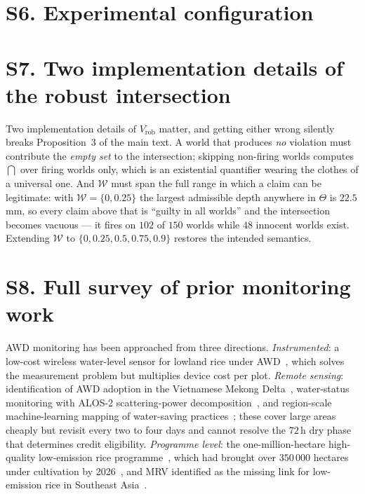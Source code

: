 \section*{S6. Experimental configuration}

\begin{table}[!h]
\centering
\caption{Experimental configuration. Every value is
reproducible from the released code and the public ERA5 forcing.}
\label{tab:setup}
\footnotesize

\end{table}

\section*{S7. Two implementation details of the robust intersection}

Two implementation details of $V_{\mathrm{rob}}$ matter, and getting either
wrong silently breaks Proposition~3 of the main text. A world that produces
\emph{no} violation must contribute the \emph{empty set} to the intersection;
skipping non-firing worlds computes $\bigcap$ over firing worlds only, which is
an existential quantifier wearing the clothes of a universal one. And
$\mathcal{W}$ must span the full range in which a claim can be legitimate: with
$\mathcal{W}=\{0,0.25\}$ the largest admissible depth anywhere in $\Theta$ is
$22.5$\,mm, so every claim above that is ``guilty in all worlds'' and the
intersection becomes vacuous --- it fires on $102$ of $150$ worlds while $48$
innocent worlds exist. Extending $\mathcal{W}$ to $\{0,0.25,0.5,0.75,0.9\}$
restores the intended semantics.

\section*{S8. Full survey of prior monitoring work}

AWD monitoring has been approached from three directions. \emph{Instrumented}: a
low-cost wireless water-level sensor for lowland rice under
AWD~\cite{delacruz2022}, which solves the measurement problem but multiplies
device cost per plot. \emph{Remote sensing}: identification of AWD adoption in
the Vietnamese Mekong Delta~\cite{lovell2019}, water-status monitoring with
ALOS-2 scattering-power decomposition~\cite{islam2026alose}, and region-scale
machine-learning mapping of water-saving practices~\cite{mlrice2025}; these cover
large areas cheaply but revisit every two to four days and cannot resolve the
$72$\,h dry phase that determines credit eligibility. \emph{Programme level}: the
one-million-hectare high-quality low-emission rice programme~\cite{qd1490}, which
had brought over $350\,000$ hectares under cultivation by 2026~\cite{mae2026progress},
and MRV identified as the missing link for low-emission rice in Southeast
Asia~\cite{irri2026mrv}.

